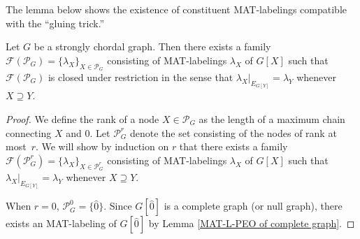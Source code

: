 \documentclass[ALCO, Unicode,published]{cedram}
\newcommand{\F}{\mathcal{F}}
\begin{document}
The lemma below shows the existence of constituent MAT-labelings compatible with the ``gluing trick.''
\begin{lemma}\label{node MAT-labeling}
Let $ G $ be a strongly chordal graph. 
Then there exists a family $\F(\mathcal{P}_{G})= \{\lambda_{X}\}_{X \in \mathcal{P}_{G}} $ consisting of MAT-labelings $ \lambda_{X} $ of $ G[X] $ such that $\F(\mathcal{P}_{G})$ is closed under restriction in the sense that $ \lambda_{X}|_{E_{G[Y]}} = \lambda_{Y} $ whenever $ X \supseteq Y $. 
\end{lemma}
\begin{proof}
We define the rank of a node $ X \in \mathcal{P}_{G} $ as the length of a maximum chain connecting $ X $ and $ \hat{0} $.
Let $ \mathcal{P}_{G}^{r} $ denote the set consisting of the nodes of rank at most~$ r $. 
We will show by induction on $ r $ that there exists a family $\F( \mathcal{P}_{G}^{r})= \{\lambda_{X}\}_{X \in \mathcal{P}_{G}^{r}} $ consisting of MAT-labelings $ \lambda_{X} $ of $ G[X] $ such that $ \lambda_{X}|_{E_{G[Y]}} = \lambda_{Y} $ whenever $ X \supseteq Y $. 

When $ r = 0 $, $ \mathcal{P}_{G}^{0} = \{\hat{0}\} $. 
Since $ G[\hat{0}] $ is a complete graph (or null graph), there exists an MAT-labeling of $ G[\hat{0}] $ by Lemma \ref{MAT-L-PEO of complete graph}. 


\end{proof}
\end{document}
